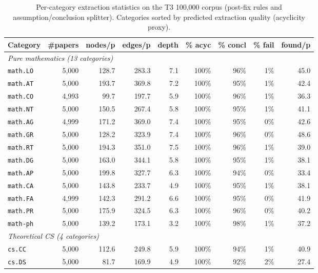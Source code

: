 \begin{table}[h]
\centering
\footnotesize
\caption{Per-category extraction statistics on the T3 100{,}000 corpus (post-fix rules and assumption/conclusion splitter). Categories sorted by predicted extraction quality (acyclicity proxy).}
\label{tab:cross-category}
\renewcommand{\arraystretch}{1.05}

\begin{tabular}{@{}lrrrrrrrr@{}}
\toprule
\textbf{Category} & \textbf{\#papers} & \textbf{nodes/p} & \textbf{edges/p} & \textbf{depth} & \textbf{\% acyc} & \textbf{\% concl} & \textbf{\% fail} & \textbf{found/p} \\
\midrule
\multicolumn{9}{l}{\textit{Pure mathematics (13 categories)}} \\
\texttt{math.LO} & 5{,}000 & 128.7 & 283.3 & 7.1 & 100\% & 96\% & 1\% & 45.0 \\
\texttt{math.AT} & 5{,}000 & 193.7 & 369.8 & 7.2 & 100\% & 95\% & 1\% & 42.4 \\
\texttt{math.CO} & 4{,}993 & 99.7 & 197.7 & 5.9 & 100\% & 96\% & 1\% & 36.3 \\
\texttt{math.NT} & 5{,}000 & 150.5 & 267.4 & 5.8 & 100\% & 95\% & 1\% & 41.1 \\
\texttt{math.AG} & 4{,}999 & 171.2 & 369.0 & 7.4 & 100\% & 95\% & 0\% & 42.6 \\
\texttt{math.GR} & 5{,}000 & 128.2 & 323.9 & 7.4 & 100\% & 96\% & 0\% & 48.6 \\
\texttt{math.RT} & 5{,}000 & 194.3 & 351.0 & 7.5 & 100\% & 96\% & 1\% & 39.0 \\
\texttt{math.DG} & 5{,}000 & 163.0 & 344.1 & 5.8 & 100\% & 95\% & 1\% & 38.1 \\
\texttt{math.AP} & 5{,}000 & 199.8 & 327.7 & 6.3 & 100\% & 94\% & 0\% & 33.4 \\
\texttt{math.CA} & 5{,}000 & 143.8 & 233.7 & 4.9 & 100\% & 95\% & 1\% & 38.1 \\
\texttt{math.FA} & 4{,}999 & 142.3 & 291.2 & 6.6 & 100\% & 95\% & 0\% & 41.9 \\
\texttt{math.PR} & 5{,}000 & 175.9 & 324.5 & 6.3 & 100\% & 96\% & 0\% & 40.2 \\
\texttt{math-ph} & 5{,}000 & 139.2 & 173.1 & 3.2 & 100\% & 98\% & 1\% & 37.2 \\
\midrule
\multicolumn{9}{l}{\textit{Theoretical CS (4 categories)}} \\
\texttt{cs.CC} & 5{,}000 & 112.6 & 249.8 & 5.9 & 100\% & 94\% & 1\% & 40.9 \\
\texttt{cs.DS} & 5{,}000 & 81.7 & 169.9 & 4.9 & 100\% & 92\% & 2\% & 27.4 \\

\end{tabular}
\end{table}
